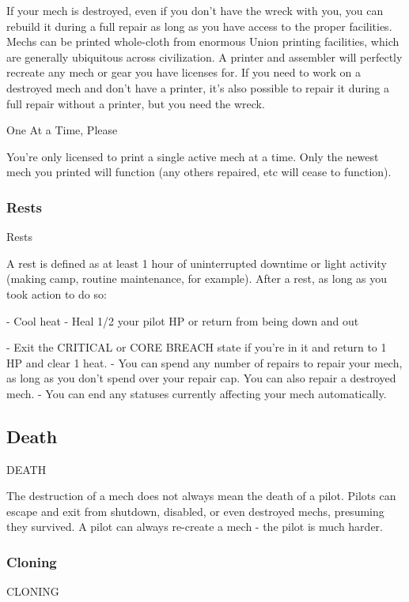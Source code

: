 If your mech is destroyed, even if you don’t have the wreck with you, you can rebuild it during a
full repair as long as you have access to the proper facilities. Mechs can be printed whole-cloth
from enormous Union printing facilities, which are generally ubiquitous across civilization. A
printer and assembler will perfectly recreate any mech or gear you have licenses for. If you need
to work on a destroyed mech and don’t have a printer, it’s also possible to repair it during a full
repair without a printer, but you need the wreck.


                                            One At a Time, Please

You’re only licensed to print a single active mech at a time. Only the newest mech you printed
will function (any others repaired, etc will cease to function).

\subsubsection{Rests}
                                                     Rests

A rest is defined as at least 1 hour of uninterrupted downtime or light activity (making camp,
routine maintenance, for example). After a rest, as long as you took action to do so:

             -   Cool heat
             -    Heal 1/2 your pilot HP or return from being down and out

             -    Exit the CRITICAL or CORE BREACH state if you’re in it and return to 1 HP and
                 clear 1 heat.
             -   You can spend any number of repairs to repair your mech, as long as you don’t
                 spend over your repair cap. You can also repair a destroyed mech.
             -   You can end any statuses currently affecting your mech automatically.


\subsection{Death}
  DEATH

The destruction of a mech does not always mean the death of a pilot. Pilots can escape and exit
from shutdown, disabled, or even destroyed mechs, presuming they survived. A pilot can always
re-create a mech - the pilot is much harder.

\subsubsection{Cloning}
                                                  CLONING

